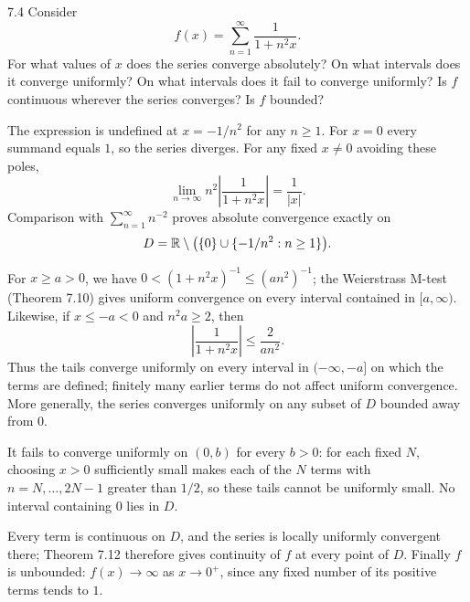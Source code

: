 \documentclass[11pt, oneside]{article}
\begin{document}
\begin{exercise}{7.4}
Consider
\[
 f(x)=\sum_{n=1}^{\infty}\frac{1}{1+n^2x}.
\]
For what values of $x$ does the series converge absolutely? On what intervals does it converge uniformly? On what intervals does it fail to converge uniformly? Is $f$ continuous wherever the series converges? Is $f$ bounded?
\end{exercise}
\begin{solution}
The expression is undefined at $x=-1/n^2$ for any $n\ge1$. For $x=0$ every summand equals $1$, so the series diverges. For any fixed $x\ne0$ avoiding these poles,
\[
 \lim_{n\to\infty}n^2\left|\frac1{1+n^2x}\right|=\frac1{|x|}.
\]
Comparison with $\displaystyle\sum_{n=1}^{\infty}n^{-2}$ proves absolute convergence exactly on
\[
 D=\mathbb{R}\setminus\bigl(\{0\}\cup\{-1/n^2:n\ge1\}\bigr).
\]

For $x\ge a>0$, we have $0<(1+n^2x)^{-1}\le(a n^2)^{-1}$; the Weierstrass M-test (Theorem 7.10) gives uniform convergence on every interval contained in $[a, \infty)$. Likewise, if $x\le-a<0$ and $n^2a\ge2$, then
\[
 \left|\frac1{1+n^2x}\right|\le\frac2{a n^2}.
\]
Thus the tails converge uniformly on every interval in $(-\infty, -a]$ on which the terms are defined; finitely many earlier terms do not affect uniform convergence. More generally, the series converges uniformly on any subset of $D$ bounded away from $0$.

It fails to converge uniformly on $(0, b)$ for every $b>0$: for each fixed $N$, choosing $x>0$ sufficiently small makes each of the $N$ terms with $n=N, \ldots, 2N-1$ greater than $1/2$, so these tails cannot be uniformly small. No interval containing $0$ lies in $D$.

Every term is continuous on $D$, and the series is locally uniformly convergent there; Theorem 7.12 therefore gives continuity of $f$ at every point of $D$. Finally $f$ is unbounded: $f(x)\to\infty$ as $x\to0^+$, since any fixed number of its positive terms tends to $1$. 
\end{solution}
\end{document}
